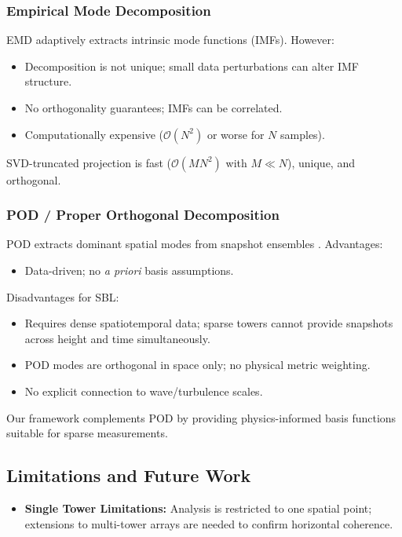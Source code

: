 \documentclass[11pt,a4paper]{article}
\begin{document}
\subsubsection{Empirical Mode Decomposition}

EMD \citep{Huang2009} adaptively extracts intrinsic mode functions (IMFs). However:
\begin{itemize}
  \item Decomposition is not unique; small data perturbations can alter IMF structure.
  \item No orthogonality guarantees; IMFs can be correlated.
  \item Computationally expensive ($\mathcal{O}(N^2)$ or worse for $N$ samples).
\end{itemize}
SVD-truncated projection is fast ($\mathcal{O}(MN^2)$ with $M \ll N$), unique, and orthogonal.

\subsubsection{POD / Proper Orthogonal Decomposition}

POD extracts dominant spatial modes from snapshot ensembles \citep{Schmid2010}. Advantages:
\begin{itemize}
  \item Data-driven; no \emph{a priori} basis assumptions.
\end{itemize}
Disadvantages for SBL:
\begin{itemize}
  \item Requires dense spatiotemporal data; sparse towers cannot provide snapshots across height and time simultaneously.
  \item POD modes are orthogonal in space only; no physical metric weighting.
  \item No explicit connection to wave/turbulence scales.
\end{itemize}
Our framework complements POD by providing physics-informed basis functions suitable for sparse measurements.

\subsection{Limitations and Future Work}
\begin{itemize}
  \item \textbf{Single Tower Limitations:} Analysis is restricted to one spatial point; extensions to multi-tower arrays are needed to confirm horizontal coherence. %
\end{itemize}
\end{document}
